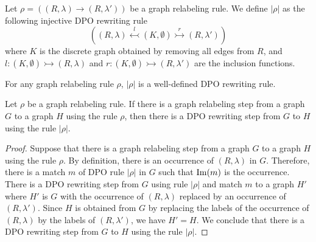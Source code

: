 
\begin{definition}
    \label{def:gls_to_dpo}
    Let $\rho = ((R,\lambda) \rightarrow (R,\lambda'))$ be a graph relabeling rule.
    We define $|\rho|$ as the following injective DPO rewriting rule 
    $$  ((R,\lambda) \overset{l}{\leftarrowtail} (K, \emptyset) \overset{r}{\rightarrowtail} (R,\lambda'))$$ 
    where $K$ is the discrete graph obtained by removing all edges from $R$, and $l : (K,\emptyset) \rightarrowtail (R,\lambda)$ and $r : (K, \emptyset) \rightarrowtail (R,\lambda')$ are the inclusion functions.
\end{definition}
For any graph relabeling rule $\rho$, $|\rho|$ is a well-defined DPO rewriting rule.

\begin{theorem}
    Let $\rho$ be a graph relabeling rule. 
    If there is a graph relabeling step from a graph $G$ to a graph $H$ using the rule $\rho$, then there is a DPO rewriting step from $G$ to $H$ using the rule $|\rho|$.
\end{theorem}
\begin{proof}
    Suppose that there is a graph relabeling step from a graph $G$ to a graph $H$ using the rule $\rho$.
    By definition, there is an occurrence of $(R,\lambda)$ in $G$. Therefore, there is a match $m$ of DPO rule $|\rho|$ in $G$ such that $\operatorname{Im}(m)$ is the occurrence. 
    There is a DPO rewriting step from $G$ using rule $|\rho|$ and match $m$ to a graph $H'$ where $H'$ is $G$ with the occurrence of $(R,\lambda)$ replaced by an occurrence of $(R,\lambda')$. 
    Since $H$ is obtained from $G$ by replacing the labels of the occurrence of $(R,\lambda)$ by the labels of $(R,\lambda')$, we have $H' = H$.
    We conclude that there is a DPO rewriting step from $G$ to $H$ using the rule $|\rho|$.
\end{proof}


